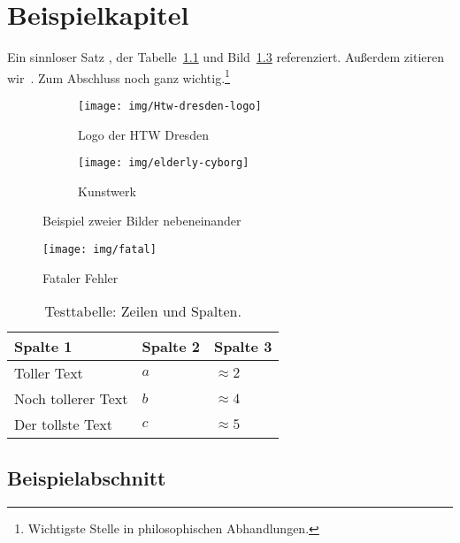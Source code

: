 
\chapter{Beispielkapitel}


Ein sinnloser Satz , der Tabelle~\ref{tab:testtable} und Bild~\ref{fig:testfig} referenziert.
Außerdem zitieren wir~\textcite{test16}.
Zum Abschluss noch ganz wichtig.\footnote{Wichtigste Stelle in philosophischen Abhandlungen.}


\begin{figure}[p]
    \centering
    \begin{subfigure}[b]{0.48\linewidth}
        \centering
        \texttt{[image: img/Htw-dresden-logo]}
        \caption{Logo der HTW Dresden}\label{fig:logo-htw}
    \end{subfigure}\enspace%
    \begin{subfigure}[b]{0.48\linewidth}
        \centering
        \texttt{[image: img/elderly-cyborg]}
        \caption{Kunstwerk}\label{fig:kunstwerk}
    \end{subfigure}
    \caption{Beispiel zweier Bilder nebeneinander}\label{fig:testfig}
\end{figure}

\begin{figure}[p]
    \centering
    \texttt{[image: img/fatal]}
    \caption{Fataler Fehler}\label{fig:fatal}
\end{figure}

\begin{table}
    \centering
    \caption[Testtable]%
        {Testtabelle: Zeilen und Spalten.}
    \begin{tabular}{lll}
        \toprule
        Spalte 1 & Spalte 2 & Spalte 3 \\
        \midrule
        Toller Text  & $a$ & $\approx 2$ \\
        Noch tollerer Text & $b$ & $\approx 4$ \\
        Der tollste Text & $c$ & $\approx 5$ \\
        \bottomrule
    \end{tabular}\label{tab:testtable}
\end{table}

\section{Beispielabschnitt}


